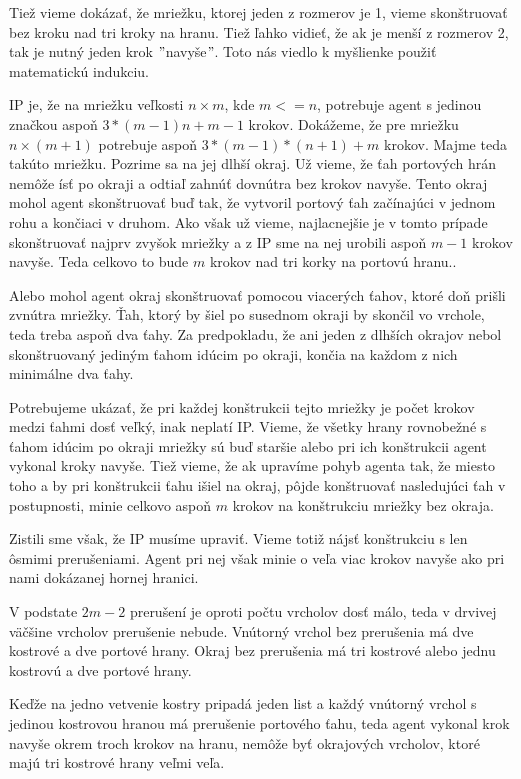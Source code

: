 Tiež vieme dokázať, že mriežku, ktorej jeden z rozmerov je 1, vieme
skonštruovať bez kroku nad tri kroky na hranu. Tiež ľahko vidieť, že ak je
menší z rozmerov 2, tak je nutný jeden krok $"$navyše$"$. Toto nás viedlo k
myšlienke použiť matematickú indukciu.

IP je, že na mriežku veľkosti $n \times m$, kde $m <= n$, potrebuje agent s
jedinou značkou aspoň $3*(m-1)n + m - 1$ krokov. Dokážeme, že pre mriežku 
$n
\times (m + 1)$ potrebuje aspoň $3*(m-1)*(n+1) + m$ krokov. Majme teda takúto mriežku.
Pozrime sa na jej dlhší okraj. Už vieme, že ťah portových hrán nemôže ísť po
okraji a odtiaľ zahnúť dovnútra bez krokov navyše. Tento okraj mohol agent
skonštruovať buď tak, že vytvoril portový ťah začínajúci v jednom rohu a
končiaci v druhom. Ako však už vieme, najlacnejšie je v tomto prípade
skonštruovať najprv zvyšok mriežky a z IP sme na nej urobili aspoň $m - 1$
krokov navyše. Teda celkovo to bude $m$ krokov nad tri korky na portovú
hranu..

Alebo mohol agent okraj skonštruovať
pomocou viacerých ťahov, ktoré doň prišli zvnútra mriežky. Ťah, ktorý by šiel
po susednom okraji by skončil vo vrchole, teda treba aspoň dva ťahy. Za
predpokladu, že ani jeden z dlhších okrajov nebol skonštruovaný jediným
ťahom idúcim po okraji, končia na každom z nich minimálne dva ťahy.

Potrebujeme ukázať, že pri každej konštrukcii tejto mriežky je počet krokov
medzi ťahmi dosť veľký, inak neplatí IP. Vieme, že všetky hrany rovnobežné s
ťahom idúcim po okraji mriežky sú buď staršie alebo pri ich konštrukcii
agent vykonal kroky navyše. Tiež vieme, že ak 
upravíme pohyb agenta tak, že miesto toho a by pri konštrukcii ťahu išiel na
okraj, pôjde konštruovať nasledujúci ťah v postupnosti, minie celkovo 
aspoň $m$ krokov na konštrukciu mriežky bez okraja.

Zistili sme však, že IP musíme upraviť. Vieme totiž nájsť konštrukciu s len
ôsmimi prerušeniami. Agent pri nej však minie o veľa viac krokov navyše ako
pri nami dokázanej hornej hranici.

V podstate $2 m - 2$ prerušení je oproti počtu vrcholov dosť málo, teda v
drvivej väčšine vrcholov prerušenie nebude. Vnútorný vrchol bez prerušenia má dve
kostrové a dve portové hrany. Okraj bez prerušenia má tri kostrové alebo
jednu kostrovú a dve portové hrany. 

Keďže na jedno vetvenie kostry pripadá jeden list a každý vnútorný vrchol s
jedinou kostrovou hranou má prerušenie portového ťahu, teda agent vykonal
krok navyše okrem troch krokov na hranu, nemôže byť okrajových vrcholov,
ktoré majú tri kostrové hrany veľmi veľa.

